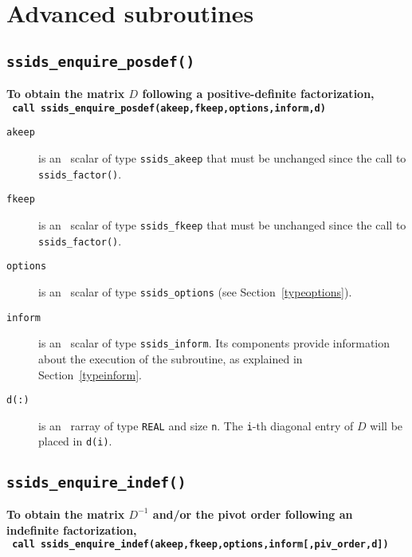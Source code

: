 \documentclass{spral}
\begin{document}
\section{Advanced subroutines}


\subsection{\texttt{ssids\_enquire\_posdef()}}
\textbf{To obtain the matrix $D$ following a positive-definite factorization,
   \vspace*{0.1cm} \\
   \texttt{ \hspace*{0.2cm}
      call ssids\_enquire\_posdef(akeep,fkeep,options,inform,d)
   }
}

\begin{description}

\item[\texttt{akeep}]  is an \intentin\ scalar of type {\tt ssids\_akeep} that
must be unchanged since the call to {\tt ssids\_factor()}.

\item[\texttt{fkeep}]  is an \intentin\ scalar of type {\tt ssids\_fkeep} that
must be unchanged since the call to {\tt ssids\_factor()}.

\item[\texttt{options}] is an \intentin\ scalar of type {\tt ssids\_options}
(see Section~\ref{typeoptions}).

\item[\texttt{inform}] is an \intentout\ scalar of type
{\tt ssids\_inform}. Its components provide information about the execution
of the subroutine, as explained in Section~\ref{typeinform}.

\item[\texttt{d(:)}] is an  \intentout\ rarray of type {\tt  REAL} and
size {\tt n}. The {\tt i}-th diagonal entry of $D$ will be placed in {\tt d(i)}.

\end{description}

\subsection{\texttt{ssids\_enquire\_indef()}}
\textbf{To obtain the matrix $D^{-1}$ and/or the pivot order following an
   indefinite factorization,
   \vspace*{0.1cm} \\
   \texttt{ \hspace*{0.2cm}
     call ssids\_enquire\_indef(akeep,fkeep,options,inform[,piv\_order,d])
   }
}
\end{document}
